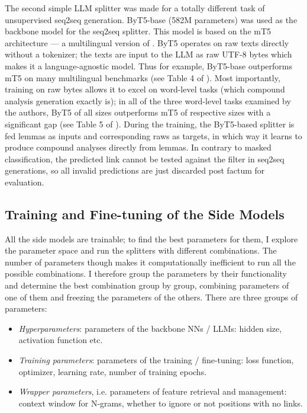 \documentclass[11pt]{article}
\begin{document}
The second simple LLM splitter was made for a totally different task of unsupervised seq2seq generation. ByT5-base (582M parameters) \cite{xue2022byt5tokenfreefuturepretrained} was used as the backbone model for the seq2seq splitter. This model is based on the mT5 architecture \cite{xue-etal-2021-mt5} --- a multilingual version of \citet{raffel2023exploringlimitstransferlearning}. ByT5 operates on raw texts directly without a tokenizer; the texts are input to the LLM as raw UTF-8 bytes which makes it a language-agnostic model. Thus for example, ByT5-base outperforms mT5 on many multilingual benchmarks (see Table 4 of \citealt{xue2022byt5tokenfreefuturepretrained}). Most importantly, training on raw bytes allows it to excel on word-level tasks (which compound analysis generation exactly is); in all of the three word-level tasks examined by the authors, ByT5 of all sizes outperforms mT5 of respective sizes with a significant gap (see Table 5 of \citealt{xue2022byt5tokenfreefuturepretrained}). During the training, the ByT5-based splitter is fed lemmas as inputs and corresponding raws as targets, in which way it learns to produce compound analyses directly from lemmas. In contrary to masked classification, the predicted link cannot be tested against the filter in seq2seq generations, so all invalid predictions are just discarded post factum for evaluation.


\subsection{Training and Fine-tuning of the Side Models}

All the side models are trainable; to find the best parameters for them, I explore the parameter space and run the splitters with different combinations. The number of parameters though makes it computationally inefficient to run all the possible combinations. I therefore group the parameters by their functionality and determine the best combination group by group, combining parameters of one of them and freezing the parameters of the others.
There are three groups of parameters:

\begin{itemize}
	
	\item \textit{Hyperparameters}: parameters of the backbone NNs / LLMs: hidden size, activation function etc.

	\item \textit{Training parameters}: parameters of the training / fine-tuning: loss function, optimizer, learning rate, number of training epochs.
	
	\item \textit{Wrapper parameters}, i.e. parameters of feature retrieval and management: context window for N-grams, whether to ignore or not positions with no links.

\end{itemize}
\end{document}
